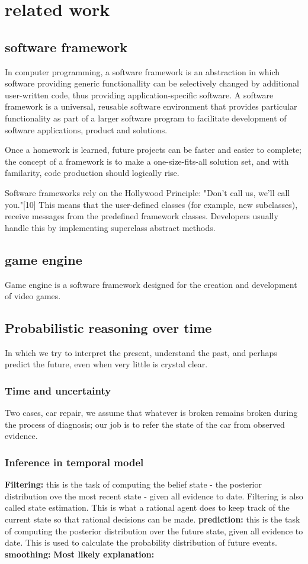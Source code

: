\section{related work}
\subsection{software framework}
In computer programming, a software framework is an abstraction in which software providing generic functionallity can be selectively changed by additional user-written code, thus providing application-specific software. A software framework is a universal, reusable software environment that provides particular functionality as part of a larger software program to facilitate development of software applications, product and solutions.

Once a homework is learned, future projects can be faster and easier to complete; the concept of a framework is to make a one-size-fits-all solution set, and with familarity, code production should logically rise.

Software frameworks rely on the Hollywood Principle: "Don't call us, we'll call you."[10] This means that the user-defined classes (for example, new subclasses), receive messages from the predefined framework classes. Developers usually handle this by implementing superclass abstract methods.
\subsection{game engine}
Game engine is a software framework designed for the creation and development of video games.

\subsection{Probabilistic reasoning over time}
In which we try to interpret the present, understand the past, and perhaps predict the future, even when very little is crystal clear.
\subsubsection{Time and uncertainty}
Two cases, car repair, we assume that whatever is broken remains broken during the process of diagnosis; our job is to refer the state of the car from observed evidence.
\subsubsection{Inference in temporal model}
\textbf{Filtering:} this is the task of computing the belief state - the posterior distribution ove the most recent state - given all evidence to date. Filtering is also called state estimation. This is what a rational agent does to keep track of the current state so that rational decisions can be made.
\textbf{prediction:} this is the task of computing the posterior distribution over the future state, given all evidence to date. This is used to calculate the probability distribution of future events.
\textbf{smoothing:}
\textbf{Most likely explanation:}
